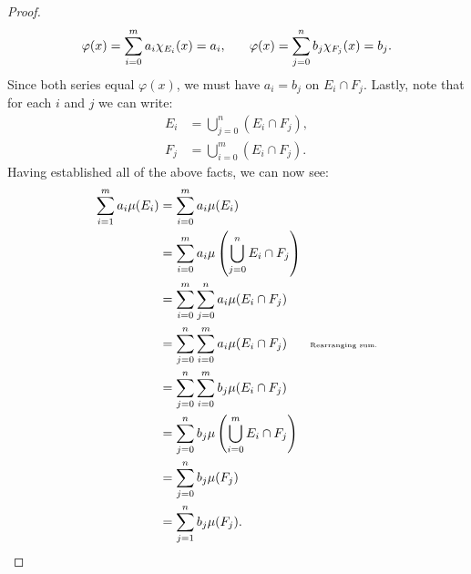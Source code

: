 \begin{proof}
\begin{equation*}
\begin{split}
                \varphi(x) = \sum_{i = 0}^m a_i \chi_{E_i}(x) = a_i, \h9\h9 \varphi(x) = \sum_{j = 0}^n b_j \chi_{F_j}(x) = b_j.
            \end{split}
            \end{equation*}
        Since both series equal $\varphi(x)$, we must have $a_i = b_j$ on $E_i \cap F_j$. Lastly, note that for each $i$ and $j$ we can write:
            \begin{equation*}
            \begin{split}
                E_i & = \bigcup_{j = 0}^n (E_i \cap F_j), \\
                F_j & = \bigcup_{i = 0}^m (E_i \cap F_j).
            \end{split}
            \end{equation*}
        Having established all of the above facts, we can now see:
            \begin{equation*}
            \begin{split}
                \sum_{i = 1}^m a_i \mu(E_i) 
                & = \sum_{i = 0}^m a_i \mu(E_i) \\
                & = \sum_{i = 0}^m a_i \mu \left( \bigcup_{j = 0}^n E_i \cap F_j \right) \\
                & = \sum_{i = 0}^m \sum_{j = 0}^n a_i \mu(E_i \cap F_j) \\
                & = \sum_{j = 0}^n \sum_{i = 0}^m a_i \mu(E_i \cap F_j) \h9\h9\text{\tiny Rearranging sum.}\\
                & = \sum_{j = 0}^n \sum_{i = 0}^m b_j \mu(E_i \cap F_j) \\
                & = \sum_{j = 0}^n b_j \mu\left( \bigcup_{i = 0}^m E_i \cap F_j\right) \\
                & = \sum_{j =0}^n b_j \mu(F_j) \\
                & = \sum_{j = 1}^n b_j \mu(F_j). \qedhere
            \end{split}
            \end{equation*}
    \end{proof}

